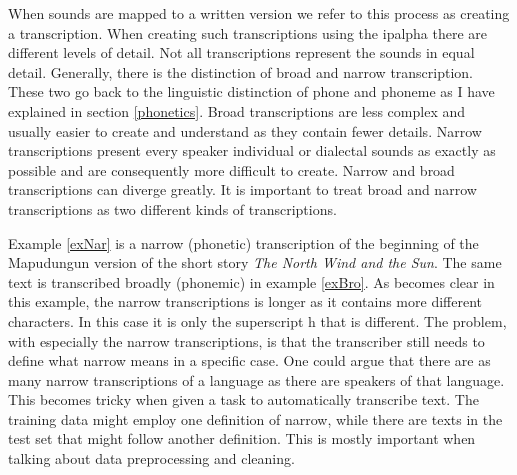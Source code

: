 When sounds are mapped to a written version we refer to this process as creating a transcription. When creating such transcriptions using the \ac{ipalpha} there are different levels of detail. Not all transcriptions represent the sounds in equal detail. Generally, there is the distinction of broad and narrow transcription. These two go back to the linguistic distinction of phone and phoneme as I have explained in section \ref{phonetics}. Broad transcriptions are less complex and usually easier to create and understand as they contain fewer details. Narrow transcriptions present every speaker individual or dialectal sounds as exactly as possible and are consequently more difficult to create. Narrow and broad transcriptions can diverge greatly. It is important to treat broad and narrow transcriptions as two different kinds of transcriptions. 

\begin{covexamples}
\item \label{exBro} 
\item \label{exNar}
\end{covexamples}

Example \ref{exNar} is a narrow (phonetic) transcription of the beginning of the Mapudungun version of the short story \textit{The North Wind and the Sun}. The same text is transcribed broadly (phonemic) in example \ref{exBro}. As becomes clear in this example, the narrow transcriptions is longer as it contains more different characters. In this case it is only the superscript h that is different. The problem, with especially the narrow transcriptions, is that the transcriber still needs to define what narrow means in a specific case. One could argue that there are as many narrow transcriptions of a language as there are speakers of that language. This becomes tricky when given a task to automatically transcribe text. The training data might employ one definition of narrow, while there are texts in the test set that might follow another definition. This is mostly important when talking about data preprocessing and cleaning.
  



